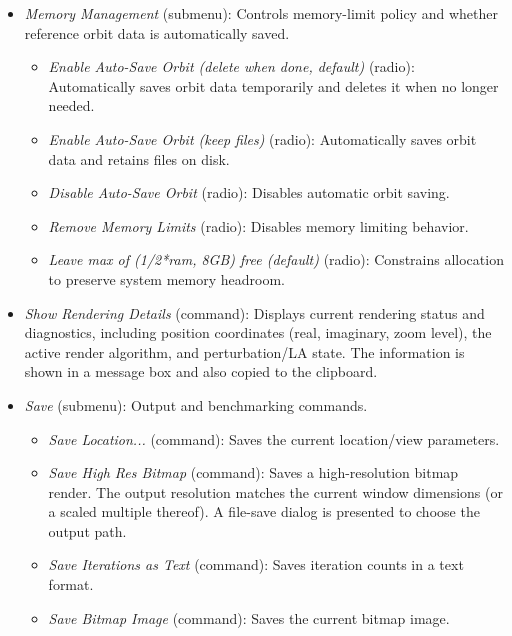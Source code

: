 \begin{itemize}
\begin{itemize}
      \item \emph{Palette Rotation} (command): Enters an interactive rotation
      mode.  The palette shifts by 10~units per frame while the image redraws
      continuously.  Moving the mouse more than 5~pixels from the starting
      position exits the mode and resets the palette to its original state.
      Useful for quickly previewing how different color offsets look.
    \end{itemize}

  \item \emph{Memory Management} (submenu): Controls memory-limit policy and
    whether reference orbit data is automatically saved.
    \begin{itemize}
      \item \emph{Enable Auto-Save Orbit (delete when done, default)} (radio):
      Automatically saves orbit data temporarily and deletes it when no longer
      needed.
      \item \emph{Enable Auto-Save Orbit (keep files)} (radio): Automatically
      saves orbit data and retains files on disk.
      \item \emph{Disable Auto-Save Orbit} (radio): Disables automatic orbit saving.

      \item \emph{Remove Memory Limits} (radio): Disables memory limiting behavior.
      \item \emph{Leave max of (1/2*ram, 8GB) free (default)} (radio): Constrains allocation to preserve system memory headroom.
    \end{itemize}

  \item \emph{Show Rendering Details} (command): Displays current rendering
  status and diagnostics, including position coordinates (real, imaginary,
  zoom level), the active render algorithm, and perturbation/LA state.
  The information is shown in a message box and also copied to the clipboard.

  \item \emph{Save} (submenu): Output and benchmarking commands.
    \begin{itemize}
      \item \emph{Save Location...} (command): Saves the current location/view parameters.
      \item \emph{Save High Res Bitmap} (command): Saves a high-resolution
      bitmap render.  The output resolution matches the current window
      dimensions (or a scaled multiple thereof).  A file-save dialog is
      presented to choose the output path.
      \item \emph{Save Iterations as Text} (command): Saves iteration counts in a text format.
      \item \emph{Save Bitmap Image} (command): Saves the current bitmap image.


\end{itemize}
\end{itemize}
